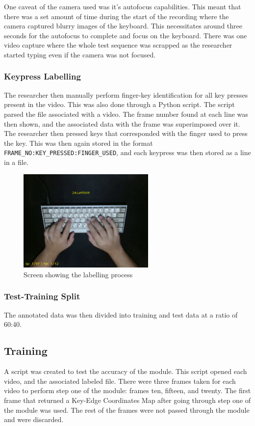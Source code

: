 \documentclass{report}
\begin{document}
One caveat of the camera used was it's autofocus capabilities. This meant that
there was a set amount of time during the start of the recording where the
camera captured blurry images of the keyboard. This necessitates around three
seconds for the autofocus to complete and focus on the keyboard. There was one
video capture where the whole test sequence was scrapped as the researcher
started typing even if the camera was not focused.

\subsubsection{Keypress Labelling}
The researcher then manually perform finger-key identification for all key
presses present in the video. This was also done through a Python script. The
script parsed the file associated with a video. The frame number found at each
line was then shown, and the associated data with the frame was superimposed
over it. The researcher then pressed keys that corresponded with the finger used
to press the key. This was then again stored in the format
\texttt{FRAME\_NO:KEY\_PRESSED:FINGER\_USED}, and each keypress was then stored
as a line in a file.

\begin{figure}[H]
	\centering
	\includegraphics[width=0.6\textwidth]{labelling.png}
	\caption{Screen showing the labelling process}
	\centering
\end{figure}


\subsubsection{Test-Training Split}
The annotated data was then divided into training and test data at a ratio of
60:40.

\subsection{Training}
A script was created to test the accuracy of the module. This script opened each
video, and the associated labeled file. There were three frames taken for each
video to perform step one of the module: frames ten, fifteen, and twenty. The
first frame that returned a Key-Edge Coordinates Map after going through step
one of the module was used. The rest of the frames were not passed through the
module and were discarded.
\end{document}
